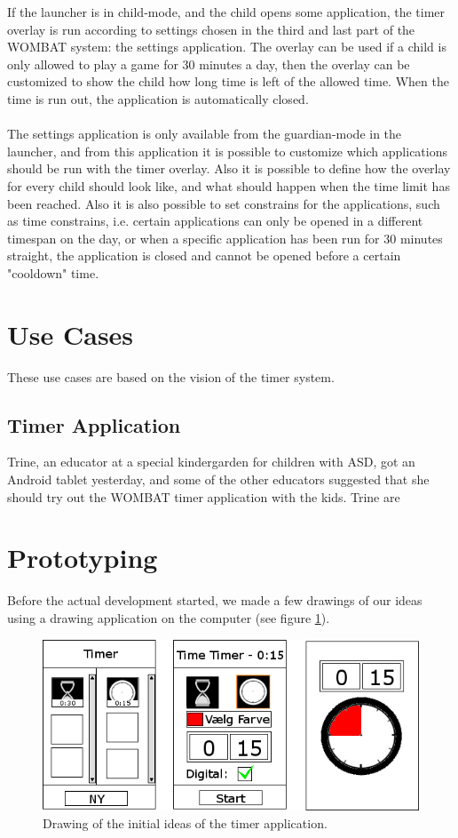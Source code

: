 	If the launcher is in child-mode, and the child opens some application, the timer overlay is run according to settings chosen in the third and last part of the WOMBAT system: the settings application. The overlay can be used if a child is only allowed to play a game for 30 minutes a day, then the overlay can be customized to show the child how long time is left of the allowed time. When the time is run out, the application is automatically closed.\\ \\
	The settings application is only available from the guardian-mode in the launcher, and from this application it is possible to customize which applications should be run with the timer overlay. Also it is possible to define how the overlay for every child should look like, and what should happen when the time limit has been reached. Also it is also possible to set constrains for the applications, such as time constrains, i.e. certain applications can only be opened in a different timespan on the day, or when a specific application has been run for 30 minutes straight, the application is closed and cannot be opened before a certain "cooldown" time.

\section{Use Cases}
These use cases are based on the vision of the timer system.

\subsection*{Timer Application}
Trine, an educator at a special kindergarden for children with ASD, got an Android tablet yesterday, and some of the other educators suggested that she should try out the WOMBAT timer application with the kids. Trine are 

\section{Prototyping}
Before the actual development started, we made a few drawings of our ideas using a drawing application on the computer (see figure \ref{fig:init_drawings}).

\begin{figure}[H]
	\centering
		\includegraphics[width=\textwidth]{Images/paper_prototype/init_drawings.png}
			\caption{Drawing of the initial ideas of the timer application.}
	\label{fig:init_drawings}
\end{figure}

